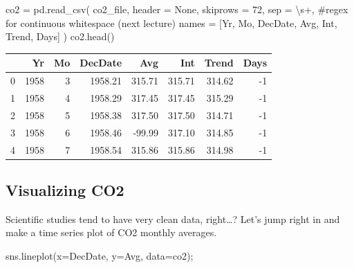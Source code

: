 \documentclass[
  letterpaper,
  DIV=11,
  numbers=noendperiod]{scrreprt}
\newenvironment{Shaded}{\begin{snugshade}}{\end{snugshade}}
\newcommand{\CommentTok}[1]{\textcolor[rgb]{0.37,0.37,0.37}{#1}}
\newcommand{\DecValTok}[1]{\textcolor[rgb]{0.68,0.00,0.00}{#1}}
\newcommand{\NormalTok}[1]{\textcolor[rgb]{0.00,0.23,0.31}{#1}}
\newcommand{\OperatorTok}[1]{\textcolor[rgb]{0.37,0.37,0.37}{#1}}
\newcommand{\StringTok}[1]{\textcolor[rgb]{0.13,0.47,0.30}{#1}}
\newcommand{\VariableTok}[1]{\textcolor[rgb]{0.07,0.07,0.07}{#1}}
\begin{document}
\begin{Shaded}
\begin{Highlighting}[]
\NormalTok{co2 }\OperatorTok{=}\NormalTok{ pd.read\_csv(}
\NormalTok{    co2\_file, header }\OperatorTok{=} \VariableTok{None}\NormalTok{, skiprows }\OperatorTok{=} \DecValTok{72}\NormalTok{,}
\NormalTok{    sep }\OperatorTok{=} \StringTok{\textquotesingle{}\textbackslash{}s+\textquotesingle{}}\NormalTok{, }\CommentTok{\#regex for continuous whitespace (next lecture)}
\NormalTok{    names }\OperatorTok{=}\NormalTok{ [}\StringTok{\textquotesingle{}Yr\textquotesingle{}}\NormalTok{, }\StringTok{\textquotesingle{}Mo\textquotesingle{}}\NormalTok{, }\StringTok{\textquotesingle{}DecDate\textquotesingle{}}\NormalTok{, }\StringTok{\textquotesingle{}Avg\textquotesingle{}}\NormalTok{, }\StringTok{\textquotesingle{}Int\textquotesingle{}}\NormalTok{, }\StringTok{\textquotesingle{}Trend\textquotesingle{}}\NormalTok{, }\StringTok{\textquotesingle{}Days\textquotesingle{}}\NormalTok{]}
\NormalTok{)}
\NormalTok{co2.head()}
\end{Highlighting}
\end{Shaded}

\begin{tabular}{lrrrrrrr}
\toprule
{} &    Yr &  Mo &  DecDate &    Avg &    Int &  Trend &  Days \\
\midrule
0 &  1958 &   3 &  1958.21 & 315.71 & 315.71 & 314.62 &    -1 \\
1 &  1958 &   4 &  1958.29 & 317.45 & 317.45 & 315.29 &    -1 \\
2 &  1958 &   5 &  1958.38 & 317.50 & 317.50 & 314.71 &    -1 \\
3 &  1958 &   6 &  1958.46 & -99.99 & 317.10 & 314.85 &    -1 \\
4 &  1958 &   7 &  1958.54 & 315.86 & 315.86 & 314.98 &    -1 \\
\bottomrule
\end{tabular}

\hypertarget{visualizing-co2}{%
\subsection{Visualizing CO2}\label{visualizing-co2}}

Scientific studies tend to have very clean data, right\ldots? Let's jump
right in and make a time series plot of CO2 monthly averages.

\begin{Shaded}
\begin{Highlighting}[]
\NormalTok{sns.lineplot(x}\OperatorTok{=}\StringTok{\textquotesingle{}DecDate\textquotesingle{}}\NormalTok{, y}\OperatorTok{=}\StringTok{\textquotesingle{}Avg\textquotesingle{}}\NormalTok{, data}\OperatorTok{=}\NormalTok{co2)}\OperatorTok{;}
\end{Highlighting}
\end{Shaded}
\end{document}
